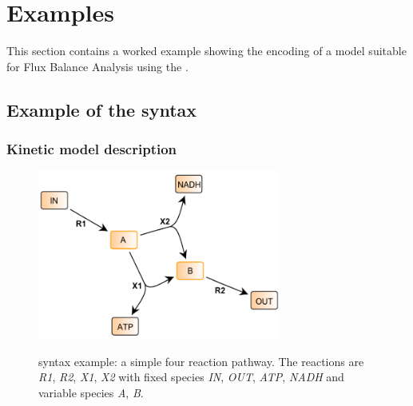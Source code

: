 
\section{Examples}
\label{examples}

This section contains a worked example showing the encoding of a model suitable for Flux Balance Analysis using the \FBCPackage.

\subsection{Example of the \FBC syntax}
\label{examples1}
\subsubsection{Kinetic model description}
\begin{figure}[h]
  \centering
  \includegraphics[width=8cm]{examples/spec-example1.pdf}\\
  \caption{\FBC syntax example: a simple four reaction pathway. The
  reactions are \textit{R1}, \textit{R2}, \textit{X1}, \textit{X2} with
  fixed species \textit{IN}, \textit{OUT}, \textit{ATP}, \textit{NADH} and
  variable species \textit{A}, \textit{B}.}
  \label{fig:example1}
\end{figure}

